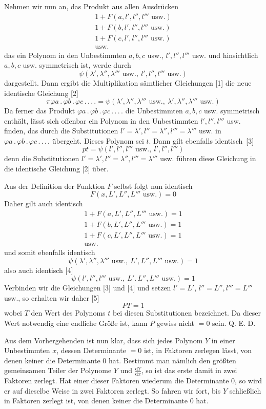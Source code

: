 Nehmen wir nun an, das Produkt aus allen Ausdrücken
\[
\begin{gathered}
1+F(a,l',l'',l'''\text{ usw.})\\
1+F(b,l',l'',l'''\text{ usw.})\\
1+F(c,l',l'',l'''\text{ usw.})\\
\text{usw.}
\end{gathered}
\]
das ein Polynom in den Unbestimmten $a,b,c$ usw., $l',l'',l'''$ usw. und hinsichtlich $a,b,c$ usw. symmetrisch ist, werde durch
\[
\psi(\lambda',\lambda'',\lambda'''\text{ usw.},\ l',l'',l'''\text{ usw.})
\]
dargestellt. Dann ergibt die Multiplikation sämtlicher Gleichungen [1] die neue identische Gleichung [2]
\[
\pi\varphi a\, .\,\varphi b\, .\,\varphi c\, .\, .\, .\, .=\psi(\lambda',\lambda'',\lambda'''\text{ usw.},\ \lambda',\lambda'',\lambda'''\text{ usw.})
\]
Da ferner das Produkt $\varphi a\, .\,\varphi b\, .\,\varphi c\, .\, .\, .\, .$ die Unbestimmten $a,b,c$ usw. symmetrisch enthält, lässt sich offenbar ein Polynom in den Unbestimmten $l',l'',l'''$ usw. finden, das durch die Substitutionen $l'=\lambda',l''=\lambda'',l'''=\lambda'''$ usw. in $\varphi a\, .\,\varphi b\, .\,\varphi c\, .\, .\, .\, .$ übergeht. Dieses Polynom sei $t$. Dann gilt ebenfalls \mbox{identisch [3]}
\[
pt=\psi(l',l'',l'''\text{ usw.},\ l',l'',l''')
\]
denn die Substitutionen $l'=\lambda',l''=\lambda'',l'''=\lambda'''$ usw. führen diese Gleichung in die identische Gleichung [2] über.

Aus der Definition der Funktion $F$ selbst folgt nun identisch
\[
F(x,L',L'',L'''\text{ usw.})=0
\]
Daher gilt auch identisch
\[
\begin{gathered}
1+F(a,L',L'',L'''\text{ usw.})=1\\
1+F(b,L',L'',L'''\text{ usw.})=1\\
1+F(c,L',L'',L'''\text{ usw.})=1\\
\text{usw.}
\end{gathered}
\]
und somit ebenfalls identisch
\[
\psi(\lambda',\lambda'',\lambda'''\text{ usw.},\ L',L'',L'''\text{ usw.})=1
\]
also auch identisch [4]
\[
\psi(l',l'',l'''\text{ usw.},\ L'.\,L'',L'''\text{ usw.})=1
\]
Verbinden wir die Gleichungen [3] und [4] und setzen $l'=L'$, $l''=L'',l'''=L'''$ usw., so erhalten wir daher [5]
\[
PT=1
\]
wobei $T$ den Wert des Polynoms $t$ bei diesen Substitutionen bezeichnet. Da dieser Wert notwendig eine endliche Größe ist, kann $P$ gewiss nicht $=0$ sein. Q. E. D.

Aus dem Vorhergehenden ist nun klar, dass sich jedes Polynom $Y$ in einer Unbestimmten $x$, dessen Determinante $=0$ ist, in Faktoren zerlegen lässt, von denen keiner die Determinante 0 hat. Bestimmt man nämlich den größten gemeinsamen Teiler der Polynome $Y$ und $\frac{\mathrm dY}{\mathrm dx}$, so ist das erste damit in zwei Faktoren zerlegt. Hat einer dieser Faktoren wiederum die Determinante 0, so wird er auf dieselbe Weise in zwei Faktoren zerlegt. So fahren wir fort, bis $Y$ schließlich in Faktoren zerlegt ist, von denen keiner die Determinante 0 hat.

